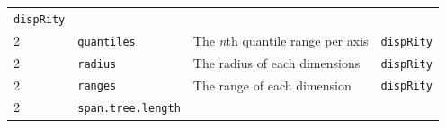 \documentclass[]{book}
\begin{document}
\begin{longtable}[]{@{}llll@{}}
\begin{minipage}[t]{0.10\columnwidth}
\texttt{dispRity}\strut
\end{minipage}\tabularnewline
\begin{minipage}[t]{0.07\columnwidth}\raggedright
2\strut
\end{minipage} & \begin{minipage}[t]{0.07\columnwidth}\raggedright
\texttt{quantiles}\strut
\end{minipage} & \begin{minipage}[t]{0.64\columnwidth}\raggedright
The \emph{n}th quantile range per axis\strut
\end{minipage} & \begin{minipage}[t]{0.10\columnwidth}\raggedright
\texttt{dispRity}\strut
\end{minipage}\tabularnewline
\begin{minipage}[t]{0.07\columnwidth}\raggedright
2\strut
\end{minipage} & \begin{minipage}[t]{0.07\columnwidth}\raggedright
\texttt{radius}\strut
\end{minipage} & \begin{minipage}[t]{0.64\columnwidth}\raggedright
The radius of each dimensions\strut
\end{minipage} & \begin{minipage}[t]{0.10\columnwidth}\raggedright
\texttt{dispRity}\strut
\end{minipage}\tabularnewline
\begin{minipage}[t]{0.07\columnwidth}\raggedright
2\strut
\end{minipage} & \begin{minipage}[t]{0.07\columnwidth}\raggedright
\texttt{ranges}\strut
\end{minipage} & \begin{minipage}[t]{0.64\columnwidth}\raggedright
The range of each dimension\strut
\end{minipage} & \begin{minipage}[t]{0.10\columnwidth}\raggedright
\texttt{dispRity}\strut
\end{minipage}\tabularnewline
\begin{minipage}[t]{0.07\columnwidth}\raggedright
2\strut
\end{minipage} & \begin{minipage}[t]{0.07\columnwidth}\raggedright
\texttt{span.tree.length}\strut
\end{minipage} & \begin{minipage}[t]{0.64\columnwidth}\raggedright

\end{minipage}
\end{longtable}
\end{document}
